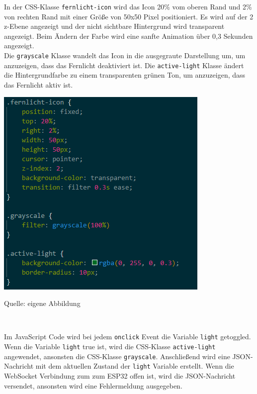 \documentclass[ngerman,12pt,a4paper]{article}
\begin{document}
	In der CSS-Klasse \texttt{fernlicht-icon} wird das Icon 20\% vom oberen Rand und 2\% von rechten Rand mit einer Größe von 50x50 Pixel positioniert. Es wird auf der 2 z-Ebene angezeigt und der nicht sichtbare Hintergrund wird transparent angezeigt. Beim Ändern der Farbe wird eine sanfte Animation über 0,3 Sekunden angezeigt. \\[0.5cm]
	Die \texttt{grayscale} Klasse wandelt das Icon in die ausgegraute Darstellung um, um anzuzeigen, dass das Fernlicht deaktiviert ist.
	Die \texttt{active-light} Klasse ändert die Hintergrundfarbe zu einem transparenten grünen Ton, um anzuzeigen, dass das Fernlicht aktiv ist. \\[0.5cm]
	\begin{center}
		\begin{minipage}[t]{0.65\textwidth}
			\includegraphics{Pictures/fernlicht-css}
			\label{fig:fernlicht-css}
			\vspace{-10pt}
			\begin{center}
				\par\small Quelle: eigene Abbildung 
			\end{center}
		\end{minipage} \\[0.75cm]
	\end{center}
	Im JavaScript Code wird bei jedem \texttt{onclick} Event die Variable \texttt{light} getoggled. Wenn die Variable \texttt{light} true ist, wird die CSS-Klasse \texttt{active-light} angewendet, ansonsten die CSS-Klasse \texttt{grayscale}. Anschließend wird eine JSON-Nachricht mit dem aktuellen Zustand der \texttt{light} Variable erstellt. Wenn die WebSocket Verbindung zum zum ESP32 offen ist, wird die JSON-Nachricht versendet, ansonsten wird eine Fehlermeldung ausgegeben. \\[0.5cm]
\end{document}
